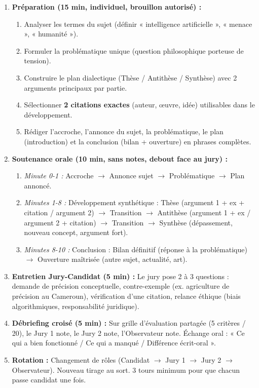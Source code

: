 \documentclass[11pt]{article}
\newcommand{\cle}[1]{{\popxbold\color{popdark}#1}}
\begin{document}
\begin{enumerate}
    \item \textbf{Préparation (15 min, individuel, brouillon autorisé) :}
    \begin{enumerate}
        \item Analyser les termes du sujet (définir « intelligence artificielle », « menace », « humanité »).
        \item Formuler la \cle{problématique} unique (question philosophique porteuse de tension).
        \item Construire le \cle{plan dialectique} (Thèse / Antithèse / Synthèse) avec 2 arguments principaux par partie.
        \item Sélectionner \textbf{2 citations exactes} (auteur, œuvre, idée) utilisables dans le développement.
        \item Rédiger l'\cle{accroche}, l'\cle{annonce du sujet}, la \cle{problématique}, le \cle{plan} (introduction) et la \cle{conclusion} (bilan + ouverture) en phrases complètes.
    \end{enumerate}
    \item \textbf{Soutenance orale (10 min, sans notes, debout face au jury) :}
    \begin{enumerate}
        \item \textit{Minute 0-1 :} Accroche $\rightarrow$ Annonce sujet $\rightarrow$ Problématique $\rightarrow$ Plan annoncé.
        \item \textit{Minutes 1-8 :} Développement synthétique : Thèse (argument 1 + ex + citation / argument 2) $\rightarrow$ Transition $\rightarrow$ Antithèse (argument 1 + ex / argument 2 + citation) $\rightarrow$ Transition $\rightarrow$ Synthèse (dépassement, nouveau concept, argument fort).
        \item \textit{Minutes 8-10 :} Conclusion : Bilan définitif (réponse à la problématique) $\rightarrow$ Ouverture maîtrisée (autre sujet, actualité, art).
    \end{enumerate}
    \item \textbf{Entretien Jury-Candidat (5 min) :} Le jury pose 2 à 3 questions : demande de précision conceptuelle, contre-exemple (ex. agriculture de précision au Cameroun), vérification d'une citation, relance éthique (biais algorithmiques, responsabilité juridique).
    \item \textbf{Débriefing croisé (5 min) :} Sur grille d'évaluation partagée (5 critères / 20), le Jury 1 note, le Jury 2 note, l'Observateur note. Échange oral : « Ce qui a bien fonctionné / Ce qui a manqué / Différence écrit-oral ».
    \item \textbf{Rotation :} Changement de rôles (Candidat $\rightarrow$ Jury 1 $\rightarrow$ Jury 2 $\rightarrow$ Observateur). Nouveau tirage au sort. 3 tours minimum pour que chacun passe candidat une fois.
\end{enumerate}
\end{document}
